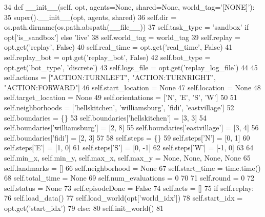 \begin{DoxyCode}
34     \textcolor{keyword}{def }\_\_init\_\_(self, opt, agents=None, shared=None, world\_tag='[NONE]'):
35         super().\_\_init\_\_(opt, agents, shared)
36         self.dir = os.path.dirname(os.path.abspath(\_\_file\_\_))
37         self.task\_type = \textcolor{stringliteral}{'sandbox'} \textcolor{keywordflow}{if} opt[\textcolor{stringliteral}{'is\_sandbox'}] \textcolor{keywordflow}{else} \textcolor{stringliteral}{'live'}
38         self.world\_tag = world\_tag
39         self.replay = opt.get(\textcolor{stringliteral}{'replay'}, \textcolor{keyword}{False})
40         self.real\_time = opt.get(\textcolor{stringliteral}{'real\_time'}, \textcolor{keyword}{False})
41         self.replay\_bot = opt.get(\textcolor{stringliteral}{'replay\_bot'}, \textcolor{keyword}{False})
42         self.bot\_type = opt.get(\textcolor{stringliteral}{'bot\_type'}, \textcolor{stringliteral}{'discrete'})
43         self.logs\_file = opt.get(\textcolor{stringliteral}{'replay\_log\_file'})
44 
45         self.actions = [\textcolor{stringliteral}{"ACTION:TURNLEFT"}, \textcolor{stringliteral}{"ACTION:TURNRIGHT"}, \textcolor{stringliteral}{"ACTION:FORWARD"}]
46         self.start\_location = \textcolor{keywordtype}{None}
47         self.location = \textcolor{keywordtype}{None}
48         self.target\_location = \textcolor{keywordtype}{None}
49         self.orientations = [\textcolor{stringliteral}{'N'}, \textcolor{stringliteral}{'E'}, \textcolor{stringliteral}{'S'}, \textcolor{stringliteral}{'W'}]
50 
51         self.neighborhoods = [\textcolor{stringliteral}{'hellskitchen'}, \textcolor{stringliteral}{'williamsburg'}, \textcolor{stringliteral}{'fidi'}, \textcolor{stringliteral}{'eastvillage'}]
52         self.boundaries = \{\}
53         self.boundaries[\textcolor{stringliteral}{'hellskitchen'}] = [3, 3]
54         self.boundaries[\textcolor{stringliteral}{'williamsburg'}] = [2, 8]
55         self.boundaries[\textcolor{stringliteral}{'eastvillage'}] = [3, 4]
56         self.boundaries[\textcolor{stringliteral}{'fidi'}] = [2, 3]
57 
58         self.steps = \{\}
59         self.steps[\textcolor{stringliteral}{'N'}] = [0, 1]
60         self.steps[\textcolor{stringliteral}{'E'}] = [1, 0]
61         self.steps[\textcolor{stringliteral}{'S'}] = [0, -1]
62         self.steps[\textcolor{stringliteral}{'W'}] = [-1, 0]
63 
64         self.min\_x, self.min\_y, self.max\_x, self.max\_y = \textcolor{keywordtype}{None}, \textcolor{keywordtype}{None}, \textcolor{keywordtype}{None}, \textcolor{keywordtype}{None}
65         self.landmarks = []
66         self.neighborhood = \textcolor{keywordtype}{None}
67         self.start\_time = time.time()
68         self.total\_time = \textcolor{keywordtype}{None}
69         self.num\_evaluations = 0
70 
71         self.round = 0
72         self.status = \textcolor{keywordtype}{None}
73         self.episodeDone = \textcolor{keyword}{False}
74         self.acts = []
75         \textcolor{keywordflow}{if} self.replay:
76             self.load\_data()
77             self.load\_world(opt[\textcolor{stringliteral}{'world\_idx'}])
78             self.start\_idx = opt.get(\textcolor{stringliteral}{'start\_idx'})
79         \textcolor{keywordflow}{else}:
80             self.init\_world()
81 
\end{DoxyCode}


